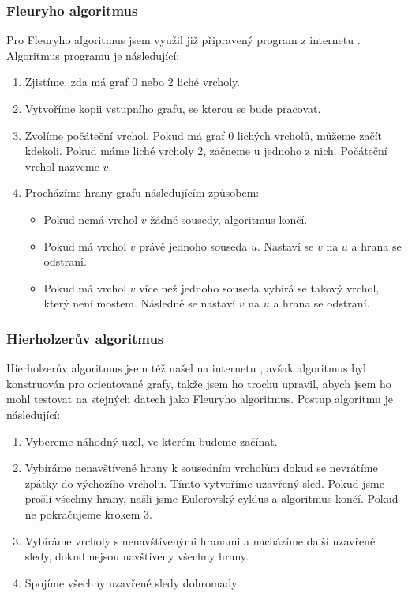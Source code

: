 \documentclass[12pt, a4paper]{article}
\begin{document}
\subsubsection{Fleuryho algoritmus}
Pro Fleuryho algoritmus jsem využil již připravený program z internetu \cite{Geeks2}. Algoritmus programu je následující:
\begin{enumerate}
\item Zjistíme, zda má graf 0 nebo 2 liché vrcholy.
\item Vytvoříme kopii vstupního grafu, se kterou se bude pracovat.
\item Zvolíme počáteční vrchol. Pokud má graf 0 lichých vrcholů, můžeme začít kdekoli. Pokud máme liché vrcholy 2, začneme u jednoho z nich. Počáteční vrchol nazveme $v$.
\item Procházíme hrany grafu následujícím způsobem:
	\begin{itemize}
	\item Pokud nemá vrchol $v$ žádné sousedy, algoritmus končí.
	\item Pokud má vrchol $v$ právě jednoho souseda $u$. Nastaví se $v$ na $u$ a hrana se odstraní.
	\item Pokud má vrchol $v$ více než jednoho souseda vybírá se takový vrchol, který není mostem. Následně se nastaví $v$ na $u$ a hrana se odstraní.
	\end{itemize}
\end{enumerate}

\subsubsection{Hierholzerův algoritmus}
Hierholzerův algoritmus jsem též našel na internetu \cite{Java} , avšak algoritmus byl konstruován pro orientované grafy, takže jsem ho trochu upravil, abych jsem ho mohl testovat na stejných datech jako Fleuryho algoritmus. Postup algoritmu je následující:
\begin{enumerate}
\item Vybereme náhodný uzel, ve kterém budeme začínat.
\item Vybíráme nenavštívené hrany k sousedním vrcholům dokud se nevrátíme zpátky do výchozího vrcholu. Tímto vytvoříme uzavřený sled. Pokud jsme prošli všechny hrany, našli jsme Eulerovský cyklus a algoritmus končí. Pokud ne pokračujeme krokem 3.
\item Vybíráme vrcholy s nenavštívenými hranami a nacházíme další uzavřené sledy, dokud nejsou navštíveny všechny hrany.
\item Spojíme všechny uzavřené sledy dohromady.
\end{enumerate}
\end{document}
